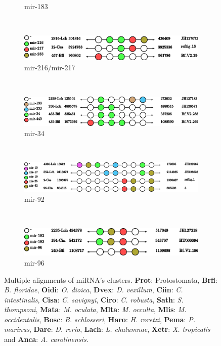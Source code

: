 \documentclass[graybox]{svmult}
\begin{document}
\begin{figure}[ht!]
\begin{subfigure}[t]{0.45\textwidth}
        \caption{mir-183}
    \end{subfigure}
    \\
    \begin{subfigure}[t]{0.45\textwidth}
        \centering
        \includegraphics[height=1.2 cm]{./Images/Cluster_images/mir-216_126_467}
        \caption{mir-216/mir-217}
       \end{subfigure}
     \\
    \begin{subfigure}[t]{0.45\textwidth}
        \centering
        \includegraphics[height=1.2 cm]{./Images/Cluster_images/mir-34_11A_435}
        \caption{mir-34}
       \end{subfigure}
        ~
         \begin{subfigure}[t]{0.45\textwidth}
        \centering
        \includegraphics[height=1.2 cm]{./Images/Cluster_images/mir-92_281_4336}
        \caption{mir-92}
    \end{subfigure}
    \\
    \begin{subfigure}[t]{1\textwidth}
        \centering
        \includegraphics[height=1.2 cm]{./Images/Cluster_images/mir-96_138_240}
        \caption{mir-96}
    \end{subfigure}
    \caption{Multiple alignments of miRNA's clusters. \textbf{Prot}: 
Protostomata, \textbf{Brfl}: \textit{B. floridae}, 
\textbf{Oidi}: \textit{O. dioica}, \textbf{Dvex}: \textit{D. vexillum}, 
\textbf{Ciin}: \textit{C. intestinalis}, \textbf{Cisa}: \textit{C. savignyi}, 
\textbf{Ciro}: \textit{C. robusta}, \textbf{Sath}: \textit{S. thompsoni}, 
\textbf{Mata}: \textit{M. oculata}, \textbf{Mlta}: \textit{M. occulta}, 
\textbf{Mlis}: \textit{M. occidentalis}, \textbf{Bosc}: \textit{B. schlosseri}, 
\textbf{Haro}: \textit{H. roretzi}, \textbf{Pema}: \textit{P. marinus}, 
\textbf{Dare}: \textit{D. rerio}, \textbf{Lach}: \textit{L. chalumnae}, 
\textbf{Xetr}: \textit{X. tropicalis} and \textbf{Anca}: \textit{A. 
carolinensis}.}
\end{figure}
\end{document}
